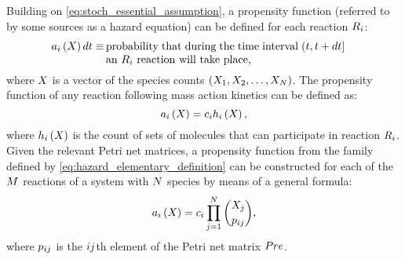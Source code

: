 Building on \eqref{eq:stoch_essential_assumption}, a propensity function (referred to by some sources as a hazard equation\supercite{Wilkinson:2012tt}) can be defined\supercite{Gillespie:1976bj} for each reaction $R_{i}$:
\begin{align}\label{eq:hazard_definition}
    \haz \dt \equiv&\, \parbox[t]{0.63\linewidth}{probability that during the time interval $\timeint$ an $\rxn$ reaction will take place,}
\end{align}
where $X_{}$ is a vector of the species counts $\left( {X}_{1}, {X}_{2}, \dots, {X}_{N} \right)$. The propensity function of any reaction following mass action kinetics can be defined as:
\begin{equation}\label{eq:hazard_elementary_definition}
    a_{i} \left( X_{} \right) = c_{i} h_{i} \left( X_{} \right),
\end{equation}
where $h_{i} \left( X_{} \right)$ is the count of sets of molecules that can participate in reaction $R_{i}$. Given the relevant Petri net matrices, a propensity function from the family defined by \eqref{eq:hazard_elementary_definition} can be constructed for each of the $M$ reactions of a system with $N$ species by means of a general formula\supercite{Wilkinson:2012tt}:
\begin{equation}\label{eq:hazard_general_formula}
    a_{i} \left( X_{} \right) = c_{i} \prod_{j=1}^{N} \binom{X_{j}}{p_{i j}},
\end{equation}
where $p_{i j}$ is the $i j$th element of the Petri net matrix $Pre$.

